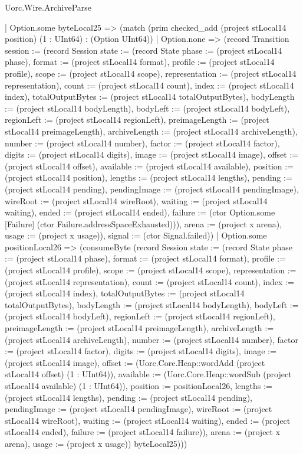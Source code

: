 \begin{lexlean}{Uorc.Wire.ArchiveParse}
\begin{semanticmodule}
{              | Option.some byteLocal25 => (match (prim checked_add (project stLocal14 position) (1 : UInt64) : (Option UInt64))
                | Option.none => (record Transition {session := (record Session {state := (record State {phase := (project stLocal14 phase), format := (project stLocal14 format), profile := (project stLocal14 profile), scope := (project stLocal14 scope), representation := (project stLocal14 representation), count := (project stLocal14 count), index := (project stLocal14 index), totalOutputBytes := (project stLocal14 totalOutputBytes), bodyLength := (project stLocal14 bodyLength), bodyLeft := (project stLocal14 bodyLeft), regionLeft := (project stLocal14 regionLeft), preimageLength := (project stLocal14 preimageLength), archiveLength := (project stLocal14 archiveLength), number := (project stLocal14 number), factor := (project stLocal14 factor), digits := (project stLocal14 digits), image := (project stLocal14 image), offset := (project stLocal14 offset), available := (project stLocal14 available), position := (project stLocal14 position), lengths := (project stLocal14 lengths), pending := (project stLocal14 pending), pendingImage := (project stLocal14 pendingImage), wireRoot := (project stLocal14 wireRoot), waiting := (project stLocal14 waiting), ended := (project stLocal14 ended), failure := (ctor Option.some [Failure] (ctor Failure.addressSpaceExhausted))}), arena := (project x arena), usage := (project x usage)}), signal := (ctor Signal.failed)})
                | Option.some positionLocal26 => (consumeByte (record Session {state := (record State {phase := (project stLocal14 phase), format := (project stLocal14 format), profile := (project stLocal14 profile), scope := (project stLocal14 scope), representation := (project stLocal14 representation), count := (project stLocal14 count), index := (project stLocal14 index), totalOutputBytes := (project stLocal14 totalOutputBytes), bodyLength := (project stLocal14 bodyLength), bodyLeft := (project stLocal14 bodyLeft), regionLeft := (project stLocal14 regionLeft), preimageLength := (project stLocal14 preimageLength), archiveLength := (project stLocal14 archiveLength), number := (project stLocal14 number), factor := (project stLocal14 factor), digits := (project stLocal14 digits), image := (project stLocal14 image), offset := (Uorc.Core.Heap::wordAdd (project stLocal14 offset) (1 : UInt64)), available := (Uorc.Core.Heap::wordSub (project stLocal14 available) (1 : UInt64)), position := positionLocal26, lengths := (project stLocal14 lengths), pending := (project stLocal14 pending), pendingImage := (project stLocal14 pendingImage), wireRoot := (project stLocal14 wireRoot), waiting := (project stLocal14 waiting), ended := (project stLocal14 ended), failure := (project stLocal14 failure)}), arena := (project x arena), usage := (project x usage)}) byteLocal25)))
}
\end{semanticmodule}
\end{lexlean}

